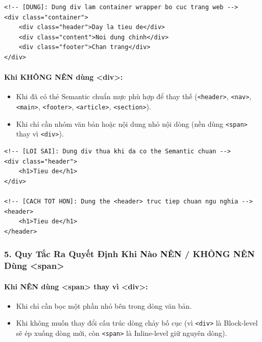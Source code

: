 \documentclass[11pt,oneside]{book}
\newcommand{\codeinline}[1]{\textcolor{accentOrange}{\texttt{#1}}}
\begin{document}
\begin{codeWindow}
\begin{lstlisting}[language=HTML5]
<!-- [DUNG]: Dung div lam container wrapper bo cuc trang web -->
<div class="container">
    <div class="header">Day la tieu de</div>
    <div class="content">Noi dung chinh</div>
    <div class="footer">Chan trang</div>
</div>
\end{lstlisting}
\end{codeWindow}

\paragraph{Khi KHÔNG NÊN dùng <div>:}
\begin{itemize}[leftmargin=1.8em, itemsep=3pt, parsep=0pt]
    \item Khi đã có thẻ Semantic chuẩn mực phù hợp để thay thế (\codeinline{<header>}, \codeinline{<nav>}, \codeinline{<main>}, \codeinline{<footer>}, \codeinline{<article>}, \codeinline{<section>}).
    \item Khi chỉ cần nhóm văn bản hoặc nội dung nhỏ nội dòng (nền dùng \codeinline{<span>} thay vì \codeinline{<div>}).
\end{itemize}

\begin{codeWindow}
\begin{lstlisting}[language=HTML5]
<!-- [LOI SAI]: Dung div thua khi da co the Semantic chuan -->
<div class="header">
    <h1>Tieu de</h1>
</div>

<!-- [CACH TOT HON]: Dung the <header> truc tiep chuan ngu nghia -->
<header>
    <h1>Tieu de</h1>
</header>
\end{lstlisting}
\end{codeWindow}

\subsubsection{5. Quy Tắc Ra Quyết Định Khi Nào NÊN / KHÔNG NÊN Dùng <span>}

\paragraph{Khi NÊN dùng <span> thay vì <div>:}
\begin{itemize}[leftmargin=1.8em, itemsep=3pt, parsep=0pt]
    \item Khi chỉ cần bọc một phần nhỏ bên trong dòng văn bản.
    \item Khi không muốn thay đổi cấu trúc dòng chảy bố cục (vì \codeinline{<div>} là Block-level sẽ ép xuống dòng mới, còn \codeinline{<span>} là Inline-level giữ nguyên dòng).
\end{itemize}
\end{document}
